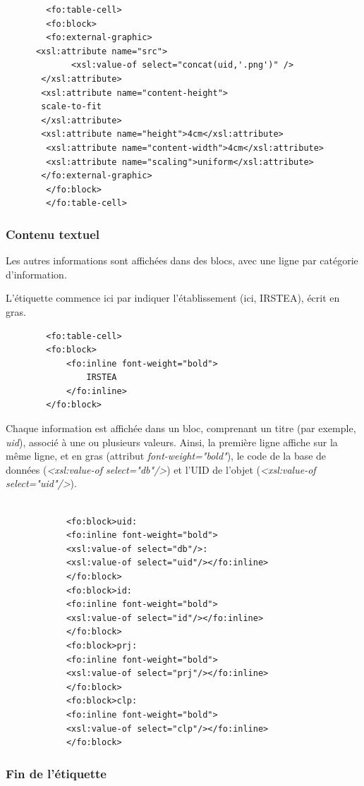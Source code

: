 \begin{lstlisting}
  		<fo:table-cell> 
  		<fo:block>
  		<fo:external-graphic>
      <xsl:attribute name="src">
             <xsl:value-of select="concat(uid,'.png')" />
       </xsl:attribute>
       <xsl:attribute name="content-height">
       scale-to-fit
       </xsl:attribute>
       <xsl:attribute name="height">4cm</xsl:attribute>
        <xsl:attribute name="content-width">4cm</xsl:attribute>
        <xsl:attribute name="scaling">uniform</xsl:attribute>      
       </fo:external-graphic>
 		</fo:block>
   		</fo:table-cell>
\end{lstlisting}
\subsubsection{Contenu textuel}

Les autres informations sont affichées dans des blocs, avec une ligne par catégorie d'information.

L'étiquette commence ici par indiquer l'établissement (ici, IRSTEA), écrit en gras.

\begin{lstlisting}
  		<fo:table-cell>
		<fo:block>
			<fo:inline font-weight="bold">
				IRSTEA
			</fo:inline>
		</fo:block>
\end{lstlisting}

Chaque information est affichée dans un bloc, comprenant un titre (par exemple, \textit{uid}), associé à une ou plusieurs valeurs. Ainsi, la première ligne affiche sur la même ligne, et en gras (attribut \textit{font-weight="bold"}), le code de la base de données (\textit{<xsl:value-of select="db"/>}) et l'UID de l'objet (\textit{<xsl:value-of select="uid"/>}).

\begin{lstlisting}   		

  			<fo:block>uid:
  			<fo:inline font-weight="bold">
  			<xsl:value-of select="db"/>:
  			<xsl:value-of select="uid"/></fo:inline>
  			</fo:block>
  			<fo:block>id:
  			<fo:inline font-weight="bold"> 
  			<xsl:value-of select="id"/></fo:inline>
  			</fo:block>
  			<fo:block>prj:
  			<fo:inline font-weight="bold"> 
  			<xsl:value-of select="prj"/></fo:inline>
  			</fo:block>
  			<fo:block>clp:
  			<fo:inline font-weight="bold">
  			<xsl:value-of select="clp"/></fo:inline>
  			</fo:block>
\end{lstlisting}

\subsubsection{Fin de l'étiquette}

